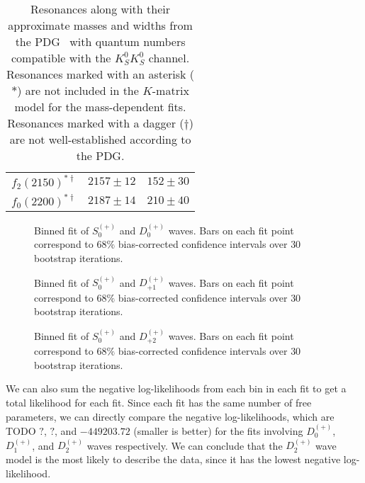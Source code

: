 \begin{table}
\begin{center}
\begin{tabular}{ccc}
      $f_2(2150)^{\ast\dagger}$ & $2157\pm 12$ & $152\pm 30$ \\
      $f_0(2200)^{\ast\dagger}$ & $2187\pm 14$ & $210\pm 40$ \\\bottomrule
    \end{tabular}
    \caption{Resonances along with their approximate masses and widths from the PDG~\cite{Zyla2020} with quantum numbers compatible with the $K_S^0K_S^0$ channel. Resonances marked with an asterisk ($\ast$) are not included in the $K$-matrix model for the mass-dependent fits. Resonances marked with a dagger ($\dagger$) are not well-established according to the PDG.}\label{tab:pdg-resonances}
  \end{center}
\end{table}


\begin{figure}
  \begin{center}
    
  \end{center}
  \caption{Binned fit of $S_{0}^{(+)}$ and $D_{0}^{(+)}$ waves. Bars on each fit point correspond to $68\%$ bias-corrected confidence intervals over $ 30 $ bootstrap iterations.}\label{fig:binned-fit-chisqdof-3.0-Sp-D0p}
\end{figure}
\begin{figure}
  \begin{center}
    
  \end{center}
  \caption{Binned fit of $S_{0}^{(+)}$ and $D_{+1}^{(+)}$ waves. Bars on each fit point correspond to $68\%$ bias-corrected confidence intervals over $ 30 $ bootstrap iterations.}\label{fig:binned-fit-chisqdof-3.0-Sp-D1p}
\end{figure}
\begin{figure}
  \begin{center}
    
  \end{center}
  \caption{Binned fit of $S_{0}^{(+)}$ and $D_{+2}^{(+)}$ waves. Bars on each fit point correspond to $68\%$ bias-corrected confidence intervals over $ 30 $ bootstrap iterations.}\label{fig:binned-fit-chisqdof-3.0-Sp-D2p}
\end{figure}

We can also sum the negative log-likelihoods from each bin in each fit to get a total likelihood for each fit. Since each fit has the same number of free parameters, we can directly compare the negative log-likelihoods, which are {\color{red}TODO} $?$, $?$, and $-449203.72$ (smaller is better) for the fits involving $D_0^{(+)}$, $D_1^{(+)}$, and $D_2^{(+)}$ waves respectively. We can conclude that the $D_2^{(+)}$ wave model is the most likely to describe the data, since it has the lowest negative log-likelihood.

